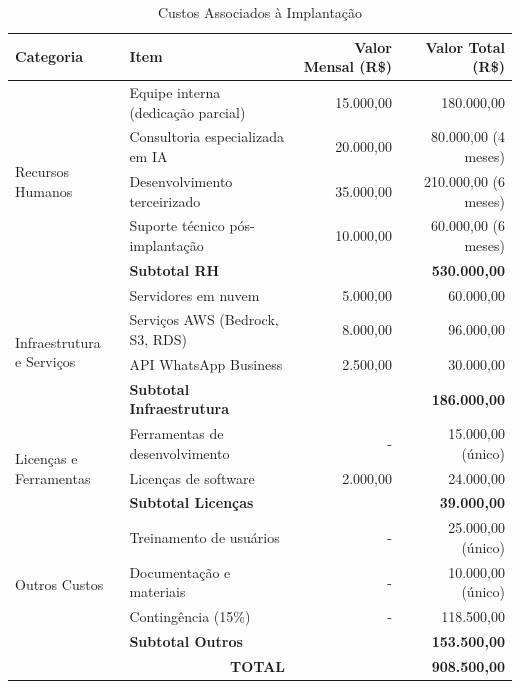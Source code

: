 \documentclass[12pt,a4paper]{article}
\begin{document}
\begin{table}[h]
\centering
\begin{tcolorbox}[enhanced, colback=white, colframe=gray!40, arc=3mm, boxrule=0.5pt]
\scriptsize
\begin{tabular}{|p{2.8cm}|p{3.2cm}|r|r|}
\hline
\rowcolor{gray!20}
\textbf{Categoria} & \textbf{Item} & \textbf{Valor Mensal (R\$)} & \textbf{Valor Total (R\$)} \\
\hline
\multirow{5}{*}{Recursos Humanos} & Equipe interna (dedicação parcial) & 15.000,00 & 180.000,00 \\
\cline{2-4}
 & Consultoria especializada em IA & 20.000,00 & 80.000,00 (4 meses) \\
\cline{2-4}
 & Desenvolvimento terceirizado & 35.000,00 & 210.000,00 (6 meses) \\
\cline{2-4}
 & Suporte técnico pós-implantação & 10.000,00 & 60.000,00 (6 meses) \\
\cline{2-4}
 & \textbf{Subtotal RH} & & \textbf{530.000,00} \\
\hline
\multirow{4}{*}{\parbox{2.8cm}{Infraestrutura\\ e Serviços}} & Servidores em nuvem & 5.000,00 & 60.000,00 \\
\cline{2-4}
 & Serviços AWS (Bedrock, S3, RDS) & 8.000,00 & 96.000,00 \\
\cline{2-4}
 & API WhatsApp Business & 2.500,00 & 30.000,00 \\
\cline{2-4}
 & \textbf{Subtotal Infraestrutura} & & \textbf{186.000,00} \\
\hline
\multirow{3}{*}{\parbox{2.8cm}{Licenças e\\ Ferramentas}} & Ferramentas de desenvolvimento & - & 15.000,00 (único) \\
\cline{2-4}
 & Licenças de software & 2.000,00 & 24.000,00 \\
\cline{2-4}
 & \textbf{Subtotal Licenças} & & \textbf{39.000,00} \\
\hline
\multirow{4}{*}{Outros Custos} & Treinamento de usuários & - & 25.000,00 (único) \\
\cline{2-4}
 & Documentação e materiais & - & 10.000,00 (único) \\
\cline{2-4}
 & Contingência (15\%) & - & 118.500,00 \\
\cline{2-4}
 & \textbf{Subtotal Outros} & & \textbf{153.500,00} \\
\hline
\multicolumn{2}{|r|}{\textbf{TOTAL}} & & \textbf{908.500,00} \\
\hline
\end{tabular}
\end{tcolorbox}
\caption{Custos Associados à Implantação}
\end{table}
\end{document}
